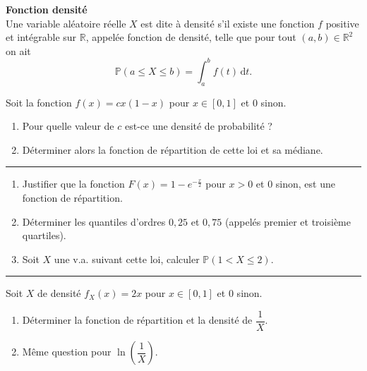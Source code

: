 \documentclass[../PolyS4.tex]{subfiles}
\begin{document}
\begin{Def}
{\textbf{Fonction densité}\\}
Une variable aléatoire réelle $X$ est dite à densité s'il existe une fonction $f$ positive et intégrable sur $\displaystyle \mathbb {R} $, appelée fonction de densité, telle que pour tout $\displaystyle (a,b)\in \mathbb {R} ^{2}$ on ait $$\displaystyle \mathbb {P} (a\leqslant X\leqslant b)=\int _{a}^{b}f(t)\,\mathrm {d} t.$$

\end{Def}



Soit la fonction $f(x) = cx(1 - x)$ pour $x \in [0, 1]$ et $0$ sinon.

\begin{enumerate}
\item Pour quelle valeur de $c$ est-ce une densité de probabilité ? 
\item Déterminer alors la fonction de répartition de cette loi et sa médiane.
\end{enumerate}

\vspace{1em}
\hrule
\vspace{1em}



\begin{enumerate}
\item Justifier que la fonction $F(x) = 1 - e^{-\frac{x}{2}}$ pour $x > 0$ et $0$ sinon, est une fonction de répartition.
\item Déterminer les quantiles d'ordres $0,25$ et $0,75$ (appelés premier et troisième quartiles).
\item Soit $X$ une v.a. suivant cette loi, calculer $\mathbb{P}(1 < X \leq 2)$.
\end{enumerate}

\vspace{1em}
\hrule
\vspace{1em}



Soit $X$ de densité $f_X(x) = 2x$ pour $x \in [0, 1]$ et $0$ sinon.

\begin{enumerate}
\item Déterminer la fonction de répartition et la densité de $\dfrac{1}{X}$.
\item Même question pour $\ln\left(\dfrac{1}{X}\right)$.
\end{enumerate}
\end{document}
